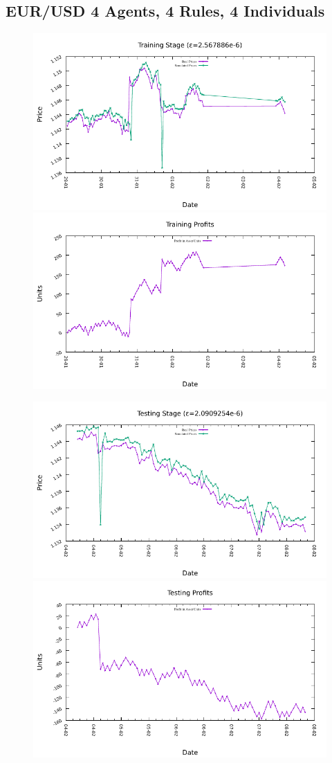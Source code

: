 





\subsection{EUR/USD 4 Agents, 4 Rules, 4 Individuals}
\label{results:forecast-eur-usd-4agents-4rules-4individuals}

\begin{figure}[htp]
\centering

\includegraphics[width=.45\textwidth]{img/plots/eur_usd_h1-4agents-4rules-4ind-100gen_training_fit.pdf}\quad
\includegraphics[width=.45\textwidth]{img/plots/eur_usd_h1-4agents-4rules-4ind-100gen_training_profits.pdf}

\medskip

\includegraphics[width=.45\textwidth]{img/plots/eur_usd_h1-4agents-4rules-4ind-100gen_testing_fit.pdf}\quad
\includegraphics[width=.45\textwidth]{img/plots/eur_usd_h1-4agents-4rules-4ind-100gen_testing_profits.pdf}


\end{figure}
